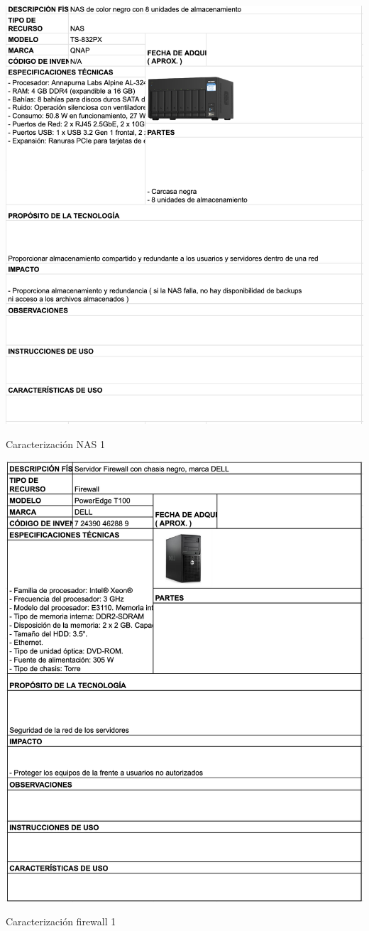 \begin{table}[H]
    \centering
    \includegraphics[width=\textwidth]{tablas-images/cp1/NAS/nas-1.png}
    \caption{Caracterización NAS 1}
    \label{tab:nas-1}
\end{table}

\begin{table}[H]
    \centering
    \includegraphics[width=\textwidth]{tablas-images/cp1/firewall/firewall.png}
    \caption{Caracterización firewall 1}\label{tab:firewall-1}
\end{table}